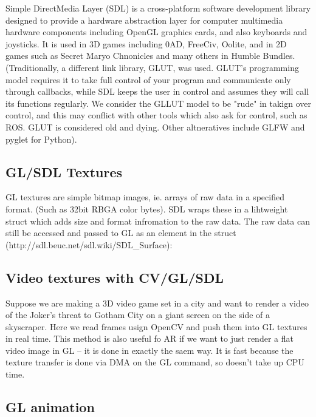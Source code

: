 \documentclass[oneside,english]{scrbook}
\begin{document}
Simple DirectMedia Layer (SDL) is a cross-platform software development library designed to provide a hardware abstraction layer for computer multimedia hardware components including OpenGL graphics cards, and also keyboards and joysticks.  It is used in 3D games including 0AD, FreeCiv, Oolite, and in 2D games such as Secret Maryo Chnonicles and many others in Humble Bundles.  (Traditionally, a different link library, GLUT, was used. GLUT's programming model requires it to take full control of your program and communicate only through callbacks, while SDL keeps the user in control and assumes they will call its functions regularly. We consider the GLLUT model to be "rude" in takign over control, and this may conflict with other tools which also ask for control, such as ROS.  GLUT is considered old and dying.  Other altneratives include GLFW and pyglet for Python).




\subsection{GL/SDL Textures}

GL textures are simple bitmap images, ie. arrays of raw data in a specified format. (Such as 32bit RBGA color bytes).  SDL wraps these in a lihtweight struct which adds size and format infromation to the raw data. The raw data can still be accessed and passed to GL as an element in the struct (http://sdl.beuc.net/sdl.wiki/SDL_Surface):



\subsection{Video textures with CV/GL/SDL}

Suppose we are making a 3D video game set in a city and want to render a video of the Joker's threat to Gotham City on a giant screen on the side of a skyscraper.   Here we read frames usign OpenCV and push them into GL textures in real time.   This method is also useful fo AR if we want to just render a flat video image in GL -- it is done in exactly the saem way.  It is fast because the texture transfer is done via DMA on the GL command, so doesn't take up CPU time.



\subsection{GL animation}
\end{document}
